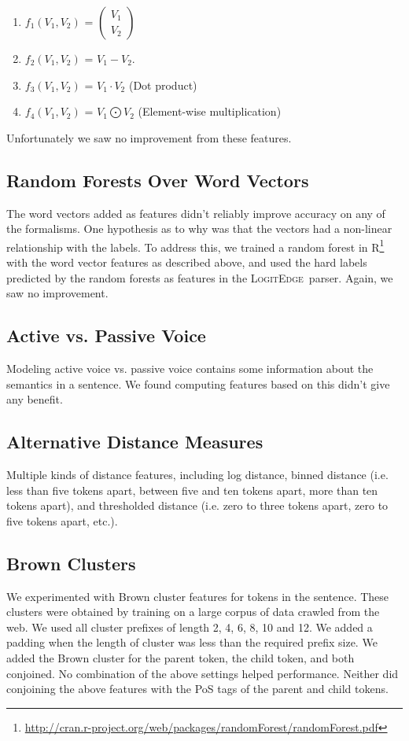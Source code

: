 \documentclass[11pt]{article}
\newcommand{\logitedge}{\textsc{LogitEdge}}
\begin{document}
\begin{enumerate}
\item $f_1(V_1,V_2)$ = $ \left( \begin{smallmatrix} V_1\\ V_2 \end{smallmatrix} \right)$
\item $f_2(V_1,V_2)$ = $V_1 - V_2$.
\item $f_3(V_1,V_2)$ = $V_1 \cdot V_2$ (Dot product)
\item $f_4(V_1,V_2)$ = $V_1 \bigodot V_2$ (Element-wise multiplication)
\end{enumerate}
Unfortunately we saw no improvement from these features.

\subsection{Random Forests Over Word Vectors}
The word vectors added as features didn't reliably improve accuracy on any of
the formalisms.
One hypothesis as to why was that the vectors had a non-linear relationship
with the labels.
To address this, we trained a random forest in
R\footnote{\url{http://cran.r-project.org/web/packages/randomForest/randomForest.pdf}}
with the word vector features as described above, and used the hard labels
predicted by the random forests as features in the \logitedge\ parser.
Again, we saw no improvement.

\subsection{Active vs. Passive Voice}
Modeling active voice vs. passive voice contains some information about the semantics in a sentence. We found computing features based on this didn't give any benefit.

\subsection{Alternative Distance Measures}
Multiple kinds of distance features, including log distance, binned distance (i.e. less than five tokens apart, between five and ten tokens apart, more than ten tokens apart), and thresholded distance (i.e. zero to three tokens apart, zero to five tokens apart, etc.).

\subsection{Brown Clusters}
We experimented with Brown cluster features \cite{Brown:1992:CNG:176313.176316}
for tokens in the sentence.
These clusters were obtained by training on a large corpus of data crawled from
the web.
We used all cluster prefixes of length 2, 4, 6, 8, 10 and 12.
We added a padding when the length of cluster was less than the required prefix
size.
We added the Brown cluster for the parent token, the child token, and both
conjoined.
No combination of the above settings helped performance.
Neither did conjoining the above features with the PoS tags of the parent and
child tokens.
\end{document}
